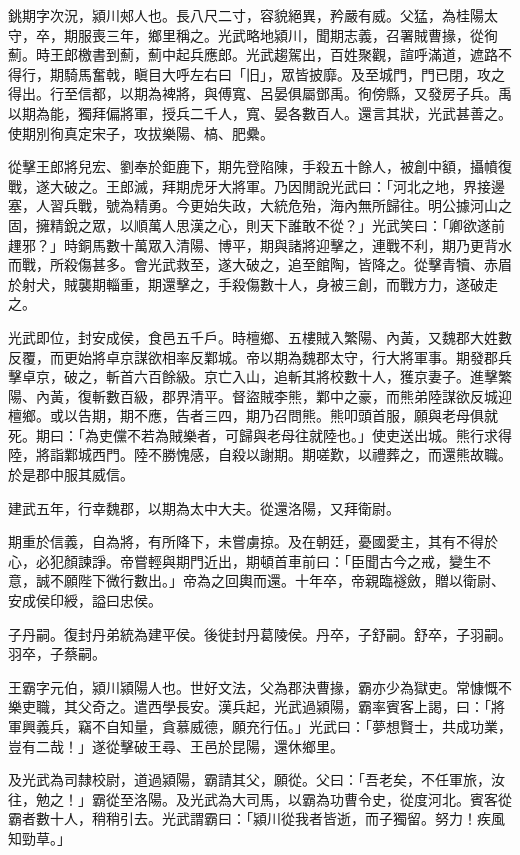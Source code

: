 
\begin{pinyinscope}
銚期字次況，潁川郟人也。長八尺二寸，容貌絕異，矜嚴有威。父猛，為桂陽太守，卒，期服喪三年，鄉里稱之。光武略地潁川，聞期志義，召署賊曹掾，從徇薊。時王郎檄書到薊，薊中起兵應郎。光武趨駕出，百姓聚觀，諠呼滿道，遮路不得行，期騎馬奮戟，瞋目大呼左右曰「旧」，眾皆披靡。及至城門，門已閉，攻之得出。行至信都，以期為裨將，與傅寬、呂晏俱屬鄧禹。徇傍縣，又發房子兵。禹以期為能，獨拜偏將軍，授兵二千人，寬、晏各數百人。還言其狀，光武甚善之。使期別徇真定宋子，攻拔樂陽、槁、肥纍。

從擊王郎將兒宏、劉奉於鉅鹿下，期先登陷陳，手殺五十餘人，被創中額，攝幩復戰，遂大破之。王郎滅，拜期虎牙大將軍。乃因閒說光武曰：「河北之地，界接邊塞，人習兵戰，號為精勇。今更始失政，大統危殆，海內無所歸往。明公據河山之固，擁精銳之眾，以順萬人思漢之心，則天下誰敢不從？」光武笑曰：「卿欲遂前䟆邪？」時銅馬數十萬眾入清陽、博平，期與諸將迎擊之，連戰不利，期乃更背水而戰，所殺傷甚多。會光武救至，遂大破之，追至館陶，皆降之。從擊青犢、赤眉於射犬，賊襲期輜重，期還擊之，手殺傷數十人，身被三創，而戰方力，遂破走之。

光武即位，封安成侯，食邑五千戶。時檀鄉、五樓賊入繁陽、內黃，又魏郡大姓數反覆，而更始將卓京謀欲相率反鄴城。帝以期為魏郡太守，行大將軍事。期發郡兵擊卓京，破之，斬首六百餘級。京亡入山，追斬其將校數十人，獲京妻子。進擊繁陽、內黃，復斬數百級，郡界清平。督盜賊李熊，鄴中之豪，而熊弟陸謀欲反城迎檀鄉。或以告期，期不應，告者三四，期乃召問熊。熊叩頭首服，願與老母俱就死。期曰：「為吏儻不若為賊樂者，可歸與老母往就陸也。」使吏送出城。熊行求得陸，將詣鄴城西門。陸不勝愧感，自殺以謝期。期嗟歎，以禮葬之，而還熊故職。於是郡中服其威信。

建武五年，行幸魏郡，以期為太中大夫。從還洛陽，又拜衛尉。

期重於信義，自為將，有所降下，未嘗虜掠。及在朝廷，憂國愛主，其有不得於心，必犯顏諫諍。帝嘗輕與期門近出，期頓首車前曰：「臣聞古今之戒，變生不意，誠不願陛下微行數出。」帝為之回輿而還。十年卒，帝親臨襚斂，贈以衛尉、安成侯印綬，謚曰忠侯。

子丹嗣。復封丹弟統為建平侯。後徙封丹葛陵侯。丹卒，子舒嗣。舒卒，子羽嗣。羽卒，子蔡嗣。

王霸字元伯，潁川潁陽人也。世好文法，父為郡決曹掾，霸亦少為獄吏。常慷慨不樂吏職，其父奇之。遣西學長安。漢兵起，光武過潁陽，霸率賓客上謁，曰：「將軍興義兵，竊不自知量，貪慕威德，願充行伍。」光武曰：「夢想賢士，共成功業，豈有二哉！」遂從擊破王尋、王邑於昆陽，還休鄉里。

及光武為司隸校尉，道過潁陽，霸請其父，願從。父曰：「吾老矣，不任軍旅，汝往，勉之！」霸從至洛陽。及光武為大司馬，以霸為功曹令史，從度河北。賓客從霸者數十人，稍稍引去。光武謂霸曰：「潁川從我者皆逝，而子獨留。努力！疾風知勁草。」


\end{pinyinscope}
